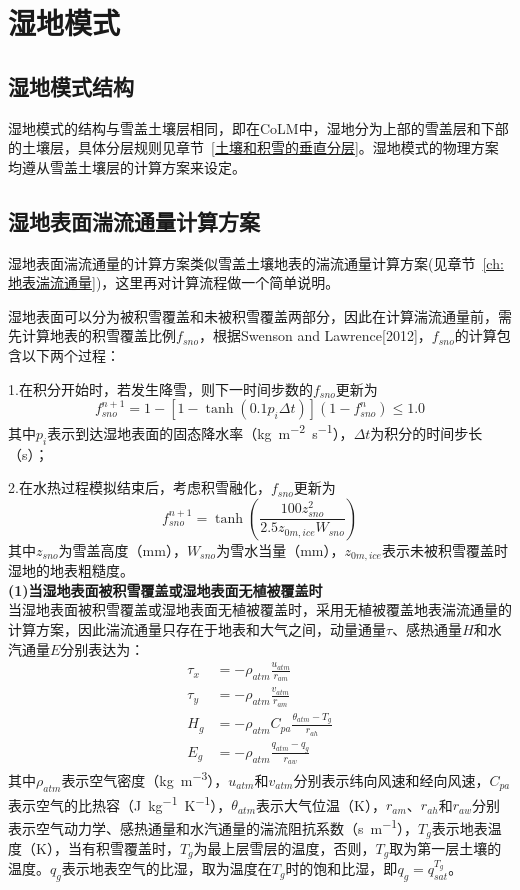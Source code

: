 \chapter{湿地模式}


\section{湿地模式结构}
湿地模式的结构与雪盖土壤层相同，即在CoLM中，湿地分为上部的雪盖层和下部的土壤层，具体分层规则见章节~\ref{土壤和积雪的垂直分层}。湿地模式的物理方案均遵从雪盖土壤层的计算方案来设定。

\section{湿地表面湍流通量计算方案}
湿地表面湍流通量的计算方案类似雪盖土壤地表的湍流通量计算方案(见章节~\ref{ch:地表湍流通量})，这里再对计算流程做一个简单说明。

湿地表面可以分为被积雪覆盖和未被积雪覆盖两部分，因此在计算湍流通量前，需先计算地表的积雪覆盖比例$f_{sno}$，根据Swenson and Lawrence[2012]，$f_{sno}$的计算包含以下两个过程：

1.在积分开始时，若发生降雪，则下一时间步数的$f_{sno}$更新为
\begin{equation}
    f^{n+1}_{sno}=1-\left[1-\tanh{\left(0.1 p_i \Delta t\right)}\right]\left(1-f^n_{sno}\right) \leqslant 1.0
\end{equation}
其中$p_i$表示到达湿地表面的固态降水率（\unit{kg.m^{-2}.s^{-1}}），$\Delta t$为积分的时间步长（s）；

2.在水热过程模拟结束后，考虑积雪融化，$f_{sno}$更新为
\begin{equation}
    f^{n+1}_{sno}=\tanh \left(\frac{100 z^2_{sno}}{2.5z_{0m,ice} W_{sno}}\right)
\end{equation}
其中$z_{sno}$为雪盖高度（mm），$W_{sno}$为雪水当量（mm），$z_{0m,ice}$表示未被积雪覆盖时湿地的地表粗糙度。\\


\textbf {(1)当湿地表面被积雪覆盖或湿地表面无植被覆盖时}\\

当湿地表面被积雪覆盖或湿地表面无植被覆盖时，采用无植被覆盖地表湍流通量的计算方案，因此湍流通量只存在于地表和大气之间，动量通量$\tau$、感热通量$H$和水汽通量$E$分别表达为：
\begin{align}
    \tau_x &= -\rho_{atm} \frac{u_{atm}}{r_{am}} \\
    \tau_y &= -\rho_{atm} \frac{v_{atm}}{r_{am}} \\
    H_g &= -\rho_{atm} C_{pa} \frac{\theta_{atm}-T_g}{r_{ah}} \\
    E_g &= -\rho_{atm} \frac{q_{atm}-q_g}{r_{aw}}
\end{align}
其中$\rho_{atm}$表示空气密度（\unit{kg.m^{-3}}），$u_{atm}$和$v_{atm}$分别表示纬向风速和经向风速，$C_{pa}$表示空气的比热容（\unit{J.kg^{-1}.K^{-1}}），$\theta_{atm}$表示大气位温（K），$r_{am}$、$r_{ah}$和$r_{aw}$分别表示空气动力学、感热通量和水汽通量的湍流阻抗系数（\unit{s.m^{-1}}），$T_g$表示地表温度（K），当有积雪覆盖时，$T_g$为最上层雪层的温度，否则，$T_g$取为第一层土壤的温度。$q_g$表示地表空气的比湿，取为温度在$T_g$时的饱和比湿，即$q_g=q^{T_g}_{sat}$。 

